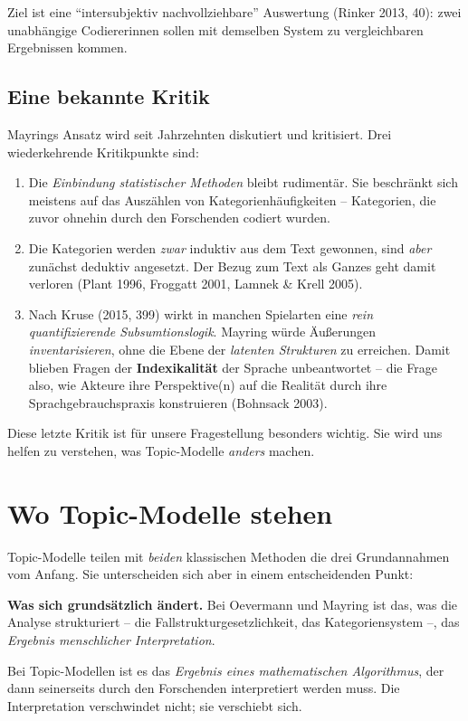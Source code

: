 \documentclass[a4paper,11pt]{article}
\begin{document}
Ziel ist eine \enquote{intersubjektiv nachvollziehbare} Auswertung
(Rinker 2013, 40): zwei unabhängige Codiererinnen sollen mit
demselben System zu vergleichbaren Ergebnissen kommen.

\subsection{Eine bekannte Kritik}

Mayrings Ansatz wird seit Jahrzehnten diskutiert und kritisiert.
Drei wiederkehrende Kritikpunkte sind:

\begin{enumerate}
\item Die \emph{Einbindung statistischer Methoden} bleibt
rudimentär. Sie beschränkt sich meistens auf das Auszählen von
Kategorienhäufigkeiten -- Kategorien, die zuvor ohnehin durch den
Forschenden codiert wurden.

\item Die Kategorien werden \emph{zwar} induktiv aus dem Text
gewonnen, sind \emph{aber} zunächst deduktiv angesetzt. Der Bezug
zum Text als Ganzes geht damit verloren (Plant 1996, Froggatt 2001,
Lamnek \& Krell 2005).

\item Nach Kruse (2015, 399) wirkt in manchen Spielarten eine
\emph{rein quantifizierende Subsumtionslogik}. Mayring würde
Äußerungen \emph{inventarisieren}, ohne die Ebene der
\emph{latenten Strukturen} zu erreichen. Damit blieben Fragen der
\textbf{Indexikalität} der Sprache unbeantwortet -- die Frage also,
wie Akteure ihre Perspektive(n) auf die Realität durch ihre
Sprachgebrauchspraxis konstruieren (Bohnsack 2003).
\end{enumerate}

Diese letzte Kritik ist für unsere Fragestellung besonders wichtig.
Sie wird uns helfen zu verstehen, was Topic-Modelle \emph{anders}
machen.

\section{Wo Topic-Modelle stehen}

Topic-Modelle teilen mit \emph{beiden} klassischen Methoden die drei
Grundannahmen vom Anfang. Sie unterscheiden sich aber in einem
entscheidenden Punkt:

\begin{merkbox}
\textbf{Was sich grundsätzlich ändert.} Bei Oevermann und Mayring ist
das, was die Analyse strukturiert -- die Fallstrukturgesetzlichkeit,
das Kategoriensystem --, das \emph{Ergebnis menschlicher Interpretation}.

Bei Topic-Modellen ist es das \emph{Ergebnis eines mathematischen
Algorithmus}, der dann seinerseits durch den Forschenden interpretiert
werden muss. Die Interpretation verschwindet nicht; sie verschiebt sich.
\end{merkbox}
\end{document}
